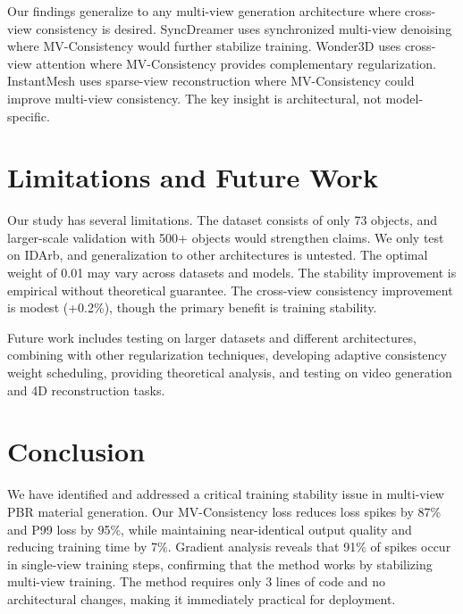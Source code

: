\documentclass{article}
\begin{document}
Our findings generalize to any multi-view generation architecture where cross-view consistency is desired. SyncDreamer uses synchronized multi-view denoising where MV-Consistency would further stabilize training. Wonder3D uses cross-view attention where MV-Consistency provides complementary regularization. InstantMesh uses sparse-view reconstruction where MV-Consistency could improve multi-view consistency. The key insight is architectural, not model-specific.

\section{Limitations and Future Work}

Our study has several limitations. The dataset consists of only 73 objects, and larger-scale validation with 500+ objects would strengthen claims. We only test on IDArb, and generalization to other architectures is untested. The optimal weight of 0.01 may vary across datasets and models. The stability improvement is empirical without theoretical guarantee. The cross-view consistency improvement is modest (+0.2\%), though the primary benefit is training stability.

Future work includes testing on larger datasets and different architectures, combining with other regularization techniques, developing adaptive consistency weight scheduling, providing theoretical analysis, and testing on video generation and 4D reconstruction tasks.

\section{Conclusion}

We have identified and addressed a critical training stability issue in multi-view PBR material generation. Our MV-Consistency loss reduces loss spikes by 87\% and P99 loss by 95\%, while maintaining near-identical output quality and reducing training time by 7\%. Gradient analysis reveals that 91\% of spikes occur in single-view training steps, confirming that the method works by stabilizing multi-view training. The method requires only 3 lines of code and no architectural changes, making it immediately practical for deployment.



\end{document}
